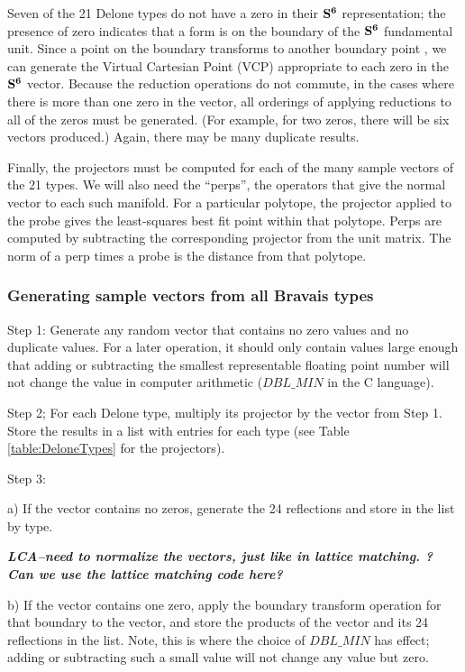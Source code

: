 \documentclass[preprint]{iucr}              %
\begin{document}
 Seven of the 21 Delone types do not have a zero in their $\bf{S^{6}}$ 
 representation; the presence of zero indicates that a form is 
 on the boundary of the $\bf{S^{6}}$ fundamental unit. Since a 
 point on the boundary transforms to another boundary 
 point \cite{andrews2019b}, we can generate the Virtual 
 Cartesian Point (VCP) \cite{andrews2019b} appropriate to 
 each zero in the $\bf{S^{6}}$ vector. Because the reduction
  operations do not commute, in the cases where there is more 
  than one zero in the vector, all orderings of applying 
  reductions to all of the zeros must be generated. (For example, 
  for two zeros, there will be six vectors produced.) Again, 
  there may be many duplicate results. 
 
 Finally, the projectors must be computed for each of the many 
 sample vectors of the 21 types. We will also need the 
 ``perps'', the operators that give the normal vector to each 
 such manifold. For a particular polytope, the projector applied to the probe gives
 the least-squares best fit point within that polytope. Perps are computed by subtracting the 
 corresponding projector from the unit matrix. The norm of a perp times
 a probe is the distance from that polytope.
 
 \subsubsection{Generating sample vectors from all Bravais types}
 
 Step 1: Generate any random vector that contains no zero 
 values and no duplicate values.  For a later operation, 
 it should only contain values large enough that adding or
 subtracting the smallest
 representable floating point number will not change the 
 value in computer arithmetic ($DBL\_MIN$ in the C language).
 
 Step 2; For each Delone type, multiply its projector by 
 the vector from Step 1. Store  the results in a list 
 with entries for each type (see Table \ref{table:DeloneTypes} 
 for the projectors).
 
 Step 3:
 
a) If the vector contains no zeros, generate the 24 reflections
 and store in the list by type. 

\textit{\textbf{LCA--need to normalize the vectors, just like in lattice matching. ? Can we use the 
lattice matching code here?}}




b) If the vector contains one zero, apply the boundary transform operation for that boundary
to the vector, and
 store the products of the vector and its 24 reflections in the list. Note, 
 this is where the choice of $DBL\_MIN$ has effect; adding or
 subtracting such a small value will not change
 any value but zero.
 
\end{document}
